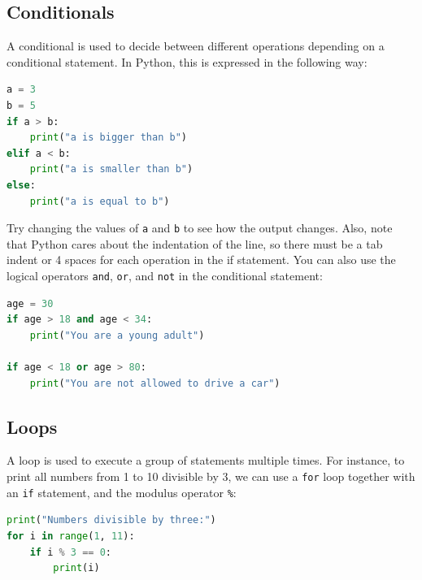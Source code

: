 \documentclass[a4paper , 12pt]{book}
\newcommand{\code}[1]{\colorbox{light-gray}{\texttt{#1}}}
\begin{document}
\subsection{Conditionals}

A conditional is used to decide between different operations depending on a conditional statement. In Python, this is expressed in the following way:

\begin{center}
\begin{lstlisting}[language=Python, frame=single]
a = 3
b = 5
if a > b:
    print("a is bigger than b")
elif a < b:    
    print("a is smaller than b")
else:
    print("a is equal to b")
\end{lstlisting}
\end{center}

Try changing the values of \code{a} and \code{b} to see how the output changes. Also, note that Python cares about the indentation of the line, so there must be a tab indent or 4 spaces for each operation in the if statement. You can also use the logical operators \code{and}, \code{or}, and \code{not} in the conditional statement:

\begin{center}
\begin{lstlisting}[language=Python, frame=single]
age = 30
if age > 18 and age < 34:
    print("You are a young adult")

if age < 18 or age > 80:
    print("You are not allowed to drive a car")
\end{lstlisting}
\end{center}

\subsection{Loops}

A loop is used to execute a group of statements multiple times. For instance, to print all numbers from 1 to 10 divisible by 3, we can use a \code{for} loop together with an \code{if} statement, and the modulus operator \code{\%}:

\begin{center}
\begin {lstlisting}[language=Python, frame=single]
print("Numbers divisible by three:")
for i in range(1, 11):
    if i %
        print(i)
\end{lstlisting}
\end{center}
\end{document}
